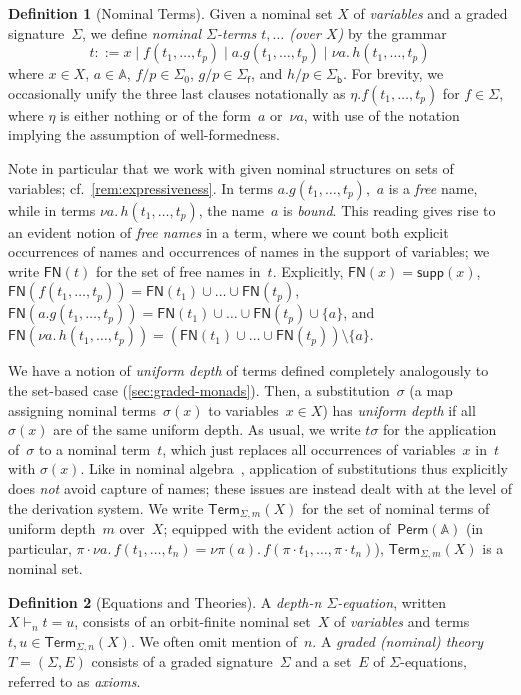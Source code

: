 \documentclass[11pt,a4paper]{amsart}
\newcommand{\Perm}{\mathsf{Perm}(\Names)}
\newcommand{\Term}{\mathsf{Term}}
\newcommand{\sigp}{\Sigma_0}
\newcommand{\sigf}{\Sigma_{\mathsf f}}
\newcommand{\sigb}{\Sigma_{\mathsf b}}
\newcommand{\FN}{\mathsf{FN}}
\newcommand{\Names}{\mathbb{A}}
\newcommand{\supp}{\mathsf{supp}}
\theoremstyle{plain}
\numberwithin{equation}{section}
\newcommand{\+}[1]{\mathcal{#1}\xspace}
\theoremstyle{definition}
\newtheorem{defn}[defn]{Definition}
\begin{document}
\begin{defn}[Nominal Terms]
  Given a nominal set \(X\) of \emph{variables} and a graded
  signature~$\Sigma$, we define \emph{nominal $\Sigma$-terms $t,\dots$
    (over \(X\))} by the grammar
    \[
      t ::= x \mid f(t_1, \ldots, t_p) \mid a.g(t_1, \ldots, t_p) \mid
      \nu a.\,h(t_1, \ldots, t_p)
    \]
    where \(x \in X\), \(a \in \Names\), \(f/p \in \sigp\),
    \(g/p \in \sigf\), and \(h/p \in \sigb\). For brevity, we
    occasionally unify the three last clauses notationally as
    $\eta.f(t_1,\dots,t_p)$ for $f\in\Sigma$, where $\eta$ is either
    nothing or of the form~$a$ or~$\nu a$, with use of the notation
    implying the assumption of well-formedness.
\end{defn}
\noindent Note in particular that we work with given nominal structures
on sets of variables; cf.~\cref{rem:expressiveness}. In terms
$a.g(t_1,\dots,t_p)$,~$a$ is a \emph{free} name, while in terms
$\nu a.\,h(t_1, \ldots, t_p)$, the name~$a$ is \emph{bound}. This
reading gives rise to an evident notion of \emph{free names} in a
term, where we count both explicit occurrences of names and
occurrences of names in the support of variables; we write $\FN(t)$
for the set of free names in~$t$. Explicitly, $\FN(x)=\supp(x)$,
$\FN(f(t_1,\dots,t_p))=\FN(t_1)\cup\dots\cup\FN(t_p)$,
$\FN(a.g(t_1,\dots,t_p))=\FN(t_1)\cup\dots\cup\FN(t_p)\cup\{a\}$, and
$\FN(\nu
a.\,h(t_1,\dots,t_p))=(\FN(t_1)\cup\dots\cup\FN(t_p))\setminus
\{a\}$.

We have a notion of \emph{uniform depth} of terms defined completely
analogously to the set-based case (\cref{sec:graded-monads}). Then,
a substitution~$\sigma$ (a map assigning nominal terms~$\sigma(x)$ to
variables~$x\in X$) has \emph{uniform depth} if all $\sigma(x)$ are of
the same uniform depth. As usual, we write $t\sigma$ for the
application of~$\sigma$ to a nominal term~$t$, which just replaces all
occurrences of variables~$x$ in~$t$ with $\sigma(x)$. Like in nominal
algebra~\cite{GabbayMathijssen07,Gabbay09,GabbayMathijssen09},
application of substitutions thus explicitly does \emph{not} avoid
capture of names; these issues are instead dealt with at the level of
the derivation system. We write $\Term_{\Sigma,m}(X)$ for the set of
nominal terms of uniform depth~$m$ over~$X$; equipped with the evident
action of~$\Perm$ (in particular,
$\pi\cdot\nu a.\,f(t_1,\dots,t_n)=\nu\pi(a).\,f(\pi\cdot
t_1,\dots,\pi\cdot t_n)$), $\Term_{\Sigma,m}(X)$ is a nominal set.

\begin{defn}[Equations and Theories]
  A \emph{depth-n $\Sigma$-equation}, written \(X \vdash_n t = u\),
  consists of an orbit-finite nominal set~\(X\) of \emph{variables}
  and terms \(t, u \in \Term_{\Sigma, n}(X)\).  We often omit mention
  of~$n$.  A \emph{graded (nominal) theory} \(T = (\Sigma, E)\)
  consists of a graded signature~\(\Sigma\) and a set~\(E\) of
  \(\Sigma\)-equations, referred to as \emph{axioms}.
\end{defn}
\end{document}

